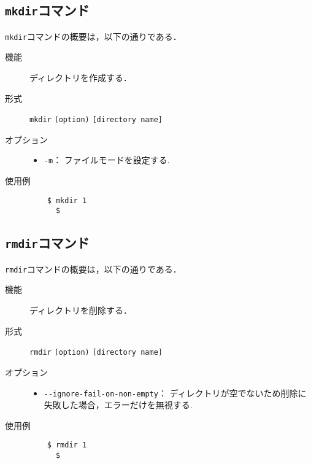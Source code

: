 \documentclass[a4j,11pt]{jarticle}
\begin{document}
\subsection{\texttt{mkdir}コマンド}
\verb|mkdir|コマンドの概要は，以下の通りである．
\begin{description}
  \item[機能] %
    ディレクトリを作成する．
  \item[形式] %
    \verb|mkdir| \verb|(option)| \verb|[directory name]|
  \item[オプション] %
    \begin{itemize}
      \item \verb|-m|：  ファイルモードを設定する.
    \end{itemize}
  \item[使用例] %
    \begin{verbatim}
    $ mkdir 1
      $
    \end{verbatim}
\end{description}

\subsection{\texttt{rmdir}コマンド}
\verb|rmdir|コマンドの概要は，以下の通りである．
\begin{description}
  \item[機能] %
    ディレクトリを削除する．
  \item[形式] %
    \verb|rmdir| \verb|(option)| \verb|[directory name]|
  \item[オプション] %
    \begin{itemize}
      \item \verb|--ignore-fail-on-non-empty|：  ディレクトリが空でないため削除に失敗した場合，エラーだけを無視する.
    \end{itemize}
  \item[使用例] %
    \begin{verbatim}
    $ rmdir 1
      $
    \end{verbatim}
\end{description}
\end{document}
